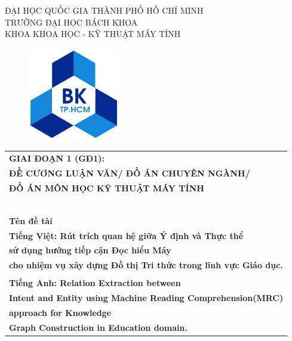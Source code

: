 \documentclass[a4paper]{article}
\begin{document}
\begin{titlepage}
\begin{center}
ĐẠI HỌC QUỐC GIA THÀNH PHỐ HỒ CHÍ MINH \\
TRƯỜNG ĐẠI HỌC BÁCH KHOA \\
KHOA KHOA HỌC - KỸ THUẬT MÁY TÍNH
\end{center}

\vspace{1cm}

\begin{figure}[h!]
\begin{center}
\includegraphics[width=4cm]{image/local/hcmut.png}
\end{center}
\end{figure}
\vspace{1cm}
\begin{center}
\begin{tabular}{c}
\multicolumn{1}{l}{\textbf{{\Large GIAI ĐOẠN 1 (GĐ1):}}}\\
\multicolumn{1}{l}{\textbf{{ĐỀ CƯƠNG LUẬN VĂN/ ĐỒ ÁN CHUYÊN NGÀNH/}}}\\
\multicolumn{1}{l}{\textbf{{ĐỒ ÁN MÔN HỌC KỸ THUẬT MÁY TÍNH}}}\\
~~\\
\hline
\\
\multicolumn{1}{l}{\textbf{{\Large Tên đề tài}}}\\
\multicolumn{1}{l}{\textbf{{Tiếng Việt: Rút trích quan hệ giữa Ý định và Thực thể}}}\\
\multicolumn{1}{l}{\textbf{{ sử dụng hướng tiếp cận Đọc hiểu Máy}}}\\
\multicolumn{1}{l}{\textbf{{ cho nhiệm vụ xây dựng Đồ thị Tri thức trong lĩnh vực Giáo dục.}}}\\
\\
\multicolumn{1}{l}{\textbf{{Tiếng Anh: Relation Extraction between}}}\\
\multicolumn{1}{l}{\textbf{{ Intent and Entity using Machine Reading Comprehension(MRC)}}}\\
\multicolumn{1}{l}{\textbf{{ approach for Knowledge}}}\\
\multicolumn{1}{l}{\textbf{{ Graph Construction in Education domain.}}}\\



\end{tabular}
\end{center}
\end{titlepage}
\end{document}

